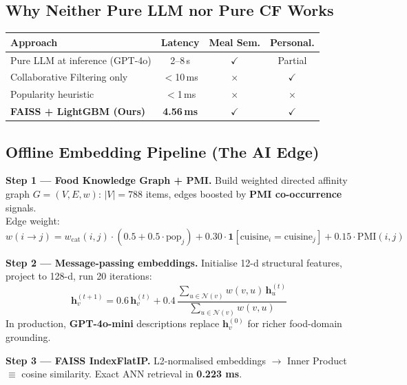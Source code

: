 \documentclass[11pt,a4paper]{article}
\newcommand{\YES}{$\checkmark$}
\newcommand{\NO}{$\times$}
\newcommand{\TO}{$\rightarrow$}
\begin{document}
\subsection{Why Neither Pure LLM nor Pure CF Works}

{\small
\begin{center}
\begin{tabularx}{\linewidth}{>{\RaggedRight\arraybackslash}X c c c}
  \toprule
  \textbf{Approach} & \textbf{Latency} & \textbf{Meal Sem.} &
    \textbf{Personal.} \\
  \midrule
  Pure LLM at inference (GPT-4o) & 2--8\,s & \YES & Partial \\
  Collaborative Filtering only   & $<$10\,ms & \NO  & \YES \\
  Popularity heuristic           & $<$1\,ms  & \NO  & \NO \\
  \rowcolor{zomalight}
  \textbf{FAISS + LightGBM (Ours)} & \textbf{4.56\,ms} & \textbf{\YES} &
    \textbf{\YES} \\
  \bottomrule
\end{tabularx}
\end{center}
}

\subsection{Offline Embedding Pipeline (The AI Edge)}

\textbf{Step 1 --- Food Knowledge Graph + PMI.}
Build weighted directed affinity graph $G=(V,E,w)$:
$|V|=788$ items, edges boosted by \textbf{PMI co-occurrence} signals.\\
Edge weight:
$w(i \rightarrow j) =
  w_{\text{cat}}(i,j)
  \cdot (0.5 + 0.5\cdot\text{pop}_j)
  + 0.30\cdot\mathbf{1}[\text{cuisine}_i = \text{cuisine}_j]
  + 0.15\cdot\text{PMI}(i,j)$

\medskip
\textbf{Step 2 --- Message-passing embeddings.}
Initialise 12-d structural features, project to 128-d, run 20 iterations:
\[
  \mathbf{h}_v^{(t+1)} =
  0.6\,\mathbf{h}_v^{(t)} +
  0.4\,\frac{\sum_{u\in\mathcal{N}(v)} w(v,u)\,\mathbf{h}_u^{(t)}}
             {\sum_{u\in\mathcal{N}(v)} w(v,u)}
\]
In production, \textbf{GPT-4o-mini} descriptions replace
$\mathbf{h}_v^{(0)}$ for richer food-domain grounding.

\medskip
\textbf{Step 3 --- FAISS IndexFlatIP.}
L2-normalised embeddings \TO{} Inner Product $\equiv$ cosine similarity.
Exact ANN retrieval in \textbf{0.223 ms}.
\end{document}
